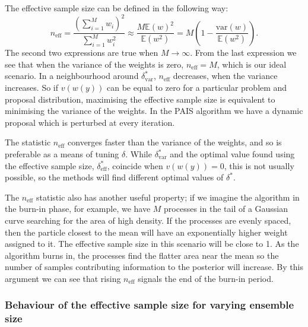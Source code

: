 \documentclass[final]{siamltex}
\newcommand{\neff}{n_{\text{eff}}}
\newcommand{\E}{{\mathbb E}}
\begin{document}
The effective sample size can be defined in the following way:
\[
	\neff = \frac{\left(\sum_{i=1}^M \! w_i\right)^2}{\sum_{i=1}^M \! w_i^2} \approx \frac{M\E(w)^2}{\E(w^2)} = M\left(1 - \frac{\mbox{var}(w)}{\mathbb{E}(w^2)}\right).
\]
The second two expressions are true when $M\rightarrow\infty$. From
the last expression we see that when the variance of the weights is
zero, $\neff = M$, which is our ideal scenario. In a neighbourhood around $\delta_{\text{var}}^*$, $\neff$ decreases, when the variance increases. So if $v(w(y))$ can be equal to zero for a particular problem and proposal distribution, maximising the effective sample size is equivalent to minimising the variance of the weights. In the PAIS algorithm we have a dynamic proposal which is perturbed at every iteration.

The statistic $\neff$ converges faster than the variance of the weights, and so is preferable as a means of tuning $\delta$. While $\delta_{\text{var}}^*$ and the optimal value found using the effective sample size, $\delta_{\text{eff}}^*$, coincide when $v(w(y)) = 0$, this is not usually possible, so the methods will find different optimal values of $\delta^*$.

The $\neff$ statistic also has another useful property; if we imagine the algorithm in the burn-in phase, for example, we have $M$ processes in the tail of a Gaussian curve searching for the area of high density. If the processes are evenly spaced, then the particle closest to the mean will have an exponentially higher weight assigned to it. The effective sample size in this scenario will be close to 1. As the algorithm burns in, the processes find the flatter area near the mean so the number of samples contributing information to the posterior will increase. By this argument we can see that rising $\neff$ signals the end of the burn-in period.

\subsubsection{Behaviour of the effective sample size for varying ensemble size}
\end{document}
